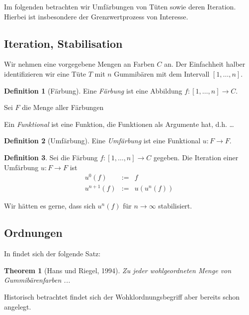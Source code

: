 \documentclass[11pt]{scrartcl}
\theoremstyle{plain}
\newtheorem{theorem}{Theorem}
\theoremstyle{definition}
\newtheorem{definition}{Definition}
\theoremstyle{remark}
\begin{document}
Im folgenden betrachten wir Umfärbungen von Tüten sowie deren
Iteration.  Hierbei ist insbesondere der Grenzwertprozess von
Interesse.



\subsection{Iteration, Stabilisation}
Wir nehmen eine vorgegebene Mengen an Farben $C$ an.  Der Einfachheit
halber identifizieren wir eine Tüte $T$ mit $n$ Gummibären mit dem
Intervall $[1, \ldots, n]$.

\begin{definition}[Färbung]
Eine \emph{Färbung} ist eine Abbildung $f: [1, \ldots, n] \to C$.

Sei $F$  die Menge aller Färbungen
\end{definition}

Ein \emph{Funktional} ist eine Funktion, die Funktionen als Argumente
hat, d.h. …

\begin{definition}[Umfärbung]
Eine \emph{Umfärbung} ist eine Funktional $u: F \to F$.
\end{definition}

\begin{definition}
Sei die Färbung $f: [1, \ldots, n] \to C$ gegeben.
Die Iteration einer Umfärbung $u: F \to F$ ist
\begin{equation}
\begin{array}{rcl}
u^0(f) &:=& f \\
u^{n+1}(f) &:=&     u(u^{n}(f))
\end{array}
\end{equation}
\end{definition}

Wir hätten es gerne, dass sich $u^{n}(f)$ für $n \to \infty$
stabilisiert.



\subsection{Ordnungen}
In \citep{hans-riegel-1994} findet sich der folgende Satz:

\begin{theorem}[Hans und Riegel, 1994]
  Zu jeder wohlgeordneten Menge von Gummibärenfarben ...
\end{theorem}

Historisch betrachtet findet sich der Wohklordnungsbegriff aber
bereits schon \citep{riegel-1993} angelegt.
\end{document}
